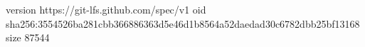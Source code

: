 version https://git-lfs.github.com/spec/v1
oid sha256:3554526ba281cbb366886363d5e46d1b8564a52daedad30c6782dbb25bf13168
size 87544
